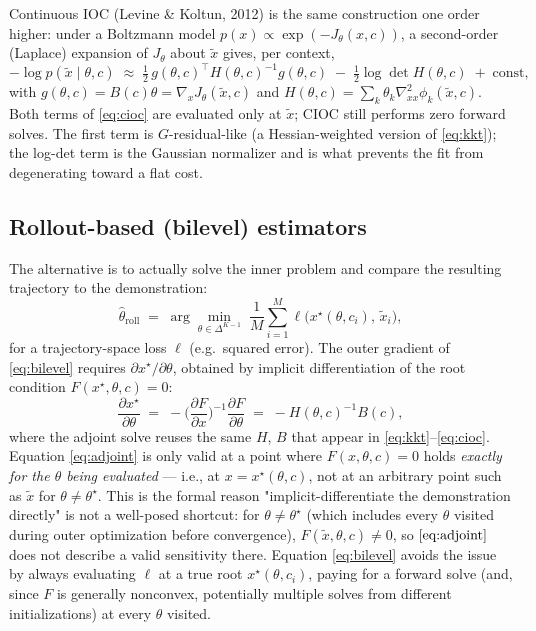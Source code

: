 \documentclass[11pt]{article}
\newcommand{\theovec}{\theta}
\newcommand{\xdemo}{\tilde{x}}
\begin{document}
Continuous IOC (Levine \& Koltun, 2012) is the same construction one order
higher: under a Boltzmann model $p(x) \propto \exp(-J_\theovec(x,c))$, a
second-order (Laplace) expansion of $J_\theovec$ about $\xdemo$ gives, per
context,
\begin{equation}
  -\log p(\xdemo \mid \theovec, c) \;\approx\;
  \tfrac{1}{2}\, g(\theovec,c)^\top H(\theovec,c)^{-1} g(\theovec,c)
  \;-\; \tfrac{1}{2}\log\det H(\theovec,c) \;+\; \mathrm{const},
  \label{eq:cioc}
\end{equation}
with $g(\theovec,c) = B(c)\theovec = \nabla_x J_\theovec(\xdemo,c)$ and
$H(\theovec,c) = \sum_k \theovec_k \nabla^2_{xx}\phi_k(\xdemo,c)$. Both terms
of \eqref{eq:cioc} are evaluated only at $\xdemo$; CIOC still performs zero
forward solves. The first term is $G$-residual-like (a Hessian-weighted
version of \eqref{eq:kkt}); the log-det term is the Gaussian normalizer and is
what prevents the fit from degenerating toward a flat cost.

\subsection{Rollout-based (bilevel) estimators}

The alternative is to actually solve the inner problem and compare the
resulting trajectory to the demonstration:
\begin{equation}
  \hat\theovec_{\mathrm{roll}}
  \;=\; \arg\min_{\theovec \in \Delta^{K-1}} \;
  \frac{1}{M}\sum_{i=1}^M \ell\big(x^\star(\theovec, c_i),\, \xdemo_i\big),
  \label{eq:bilevel}
\end{equation}
for a trajectory-space loss $\ell$ (e.g.\ squared error). The outer gradient
of \eqref{eq:bilevel} requires $\partial x^\star / \partial \theovec$, obtained
by implicit differentiation of the root condition $F(x^\star,\theovec,c)=0$:
\begin{equation}
  \frac{\partial x^\star}{\partial \theovec}
  \;=\; -\Big(\frac{\partial F}{\partial x}\Big)^{-1}
  \frac{\partial F}{\partial \theovec}
  \;=\; -H(\theovec,c)^{-1} B(c),
  \label{eq:adjoint}
\end{equation}
where the adjoint solve reuses the same $H$, $B$ that appear in
\eqref{eq:kkt}--\eqref{eq:cioc}. Equation \eqref{eq:adjoint} is only valid at
a point where $F(x,\theovec,c) = 0$ holds \emph{exactly for the $\theovec$
being evaluated} — i.e., at $x = x^\star(\theovec,c)$, not at an arbitrary
point such as $\xdemo$ for $\theovec \neq \theovec^\star$. This is the formal
reason "implicit-differentiate the demonstration directly" is not a
well-posed shortcut: for $\theovec \ne \theovec^\star$ (which includes every
$\theovec$ visited during outer optimization before convergence),
$F(\xdemo, \theovec, c) \ne 0$, so $\eqref{eq:adjoint}$ does not describe a
valid sensitivity there. Equation \eqref{eq:bilevel} avoids the issue by
always evaluating $\ell$ at a true root $x^\star(\theovec, c_i)$, paying for a
forward solve (and, since $F$ is generally nonconvex, potentially multiple
solves from different initializations) at every $\theovec$ visited.
\end{document}

